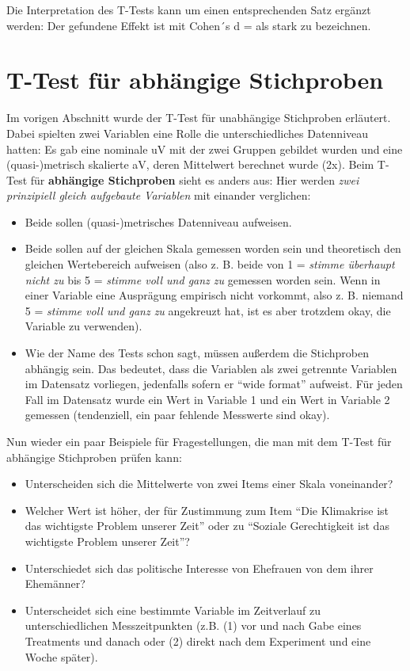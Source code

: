 \documentclass[
]{book}
\begin{document}
Die Interpretation des T-Tests kann um einen entsprechenden Satz ergänzt werden: Der gefundene Effekt ist mit Cohen´s d =  als stark zu bezeichnen.

\hypertarget{t-test-fuxfcr-abhuxe4ngige-stichproben}{%
\section{T-Test für abhängige Stichproben}\label{t-test-fuxfcr-abhuxe4ngige-stichproben}}

Im vorigen Abschnitt wurde der T-Test für unabhängige Stichproben erläutert. Dabei spielten zwei Variablen eine Rolle die unterschiedliches Datenniveau hatten: Es gab eine nominale uV mit der zwei Gruppen gebildet wurden und eine (quasi-)metrisch skalierte aV, deren Mittelwert berechnet wurde (2x). Beim T-Test für \textbf{abhängige Stichproben} sieht es anders aus: Hier werden \emph{zwei prinzipiell gleich aufgebaute Variablen} mit einander verglichen:

\begin{itemize}
\item
  Beide sollen (quasi-)metrisches Datenniveau aufweisen.
\item
  Beide sollen auf der gleichen Skala gemessen worden sein und theoretisch den gleichen Wertebereich aufweisen (also z. B. beide von 1 = \emph{stimme überhaupt nicht zu} bis 5 = \emph{stimme voll und ganz zu} gemessen worden sein. Wenn in einer Variable eine Ausprägung empirisch nicht vorkommt, also z. B. niemand 5 = \emph{stimme voll und ganz zu} angekreuzt hat, ist es aber trotzdem okay, die Variable zu verwenden).
\item
  Wie der Name des Tests schon sagt, müssen außerdem die Stichproben abhängig sein. Das bedeutet, dass die Variablen als zwei getrennte Variablen im Datensatz vorliegen, jedenfalls sofern er ``wide format'' aufweist. Für jeden Fall im Datensatz wurde ein Wert in Variable 1 und ein Wert in Variable 2 gemessen (tendenziell, ein paar fehlende Messwerte sind okay).
\end{itemize}

Nun wieder ein paar Beispiele für Fragestellungen, die man mit dem T-Test für abhängige Stichproben prüfen kann:

\begin{itemize}
\item
  Unterscheiden sich die Mittelwerte von zwei Items einer Skala voneinander?
\item
  Welcher Wert ist höher, der für Zustimmung zum Item ``Die Klimakrise ist das wichtigste Problem unserer Zeit'' oder zu ``Soziale Gerechtigkeit ist das wichtigste Problem unserer Zeit''?
\item
  Unterschiedet sich das politische Interesse von Ehefrauen von dem ihrer Ehemänner?
\item
  Unterscheidet sich eine bestimmte Variable im Zeitverlauf zu unterschiedlichen Messzeitpunkten (z.B. (1) vor und nach Gabe eines Treatments und danach oder (2) direkt nach dem Experiment und eine Woche später).
\end{itemize}
\end{document}

